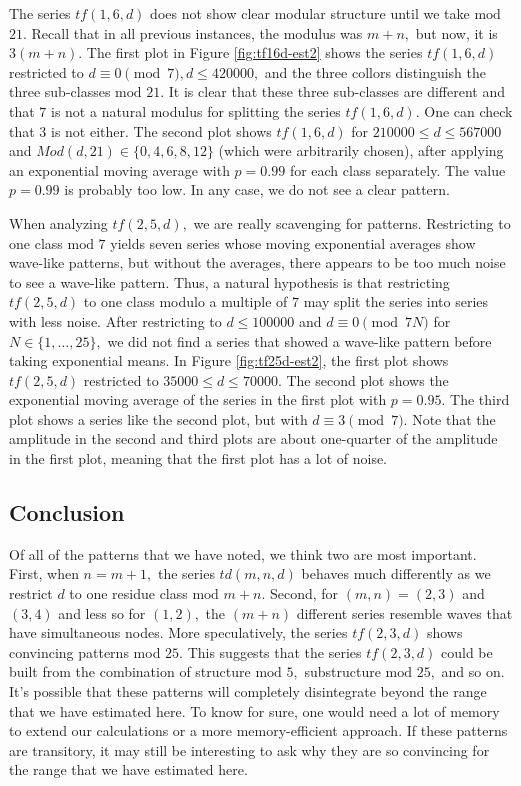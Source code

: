 \documentclass[11pt]{amsart} %
\begin{document}
The series $tf(1,6,d)$ does not show clear modular structure until we take $\text{mod}$ $21.$ Recall that in all previous instances, the modulus was $m+n,$ but now, it is $3(m+n).$
The first plot in Figure \ref{fig:tf16d-est2} shows the series $tf(1,6,d)$ restricted to $d \equiv 0 \pmod{7}, d \le 420000,$ and the three collors distinguish the three sub-classes $\text{mod}$ $21.$ It is clear that these three sub-classes are different and that $7$ is not a natural modulus for splitting the series $tf(1,6,d)$. One can check that $3$ is not either. The second plot shows $tf(1,6,d)$ for $210000 \le d \le 567000$ and $Mod(d, 21) \in \{0, 4, 6, 8, 12\}$ (which were arbitrarily chosen), after applying an exponential moving average with $p = 0.99$ for each class separately. The value $p=0.99$ is probably too low. In any case, we do not see a clear pattern.

When analyzing $tf(2,5,d),$ we are really scavenging for patterns. Restricting to one class $\text{mod}$ $7$ yields seven series whose moving exponential averages show wave-like patterns, but without the averages, there appears to be too much noise to see a wave-like pattern. Thus, a natural hypothesis is that restricting $tf(2,5,d)$ to one class modulo a multiple of $7$ may split the series into series with less noise. After restricting to $d \le 100000$ and $d \equiv 0 \pmod{7 N}$ for $N \in \{1, \ldots, 25\},$ we did not find a series that showed a wave-like pattern before taking exponential means. In Figure \ref{fig:tf25d-est2}, the first plot shows $tf(2,5,d)$ restricted to $35000 \le d \le 70000.$ The second plot shows the exponential moving average of the series in the first plot with $p = 0.95.$ The third plot shows a series like the second plot, but  with $d \equiv 3 \pmod{7}.$ Note that the amplitude in the second and third plots are about one-quarter  of the amplitude in the first plot, meaning that the first plot has a lot of noise.

\subsection{Conclusion}
Of all of the patterns that we have noted, we think two are most important. First, when $n = m+1,$ the series $td(m,n,d)$ behaves much differently as we restrict $d$ to  one residue class $\text{mod }m+n.$ Second, for $(m,n) = (2,3)$ and $(3,4)$ and less so for $(1,2),$ the $(m+n)$ different series resemble waves that have simultaneous nodes. More speculatively, the series $tf(2,3,d)$ shows convincing patterns mod $25.$ This suggests that the series $tf(2,3,d)$ could be built from the combination of structure $\text{mod}$ $5,$ substructure $\text{mod}$ $25,$ and so on. It's possible that these patterns will completely disintegrate beyond the range that we have estimated here. To know for sure, one would need a lot of memory to extend our calculations or a more memory-efficient approach. If these patterns are transitory, it may still be interesting to ask why they are so convincing for the range that we have estimated here.
\end{document}
